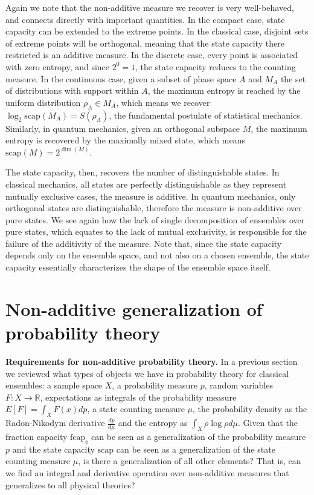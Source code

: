 \documentclass[10pt,twocolumn, nofootinbib]{revtex4-2}
\newcommand\capacity{\mathrm{scap}}
\newcommand\frcap{\mathrm{fcap}}
\newcommand{\ens}[1][e] {\mathsf{#1}} %
\begin{document}
Again we note that the non-additive measure we recover is very well-behaved, and connects directly with important quantities. In the compact case, state capacity can be extended to the extreme points. In the classical case, disjoint sets of extreme points will be orthogonal, meaning that the state capacity there restricted is an additive measure. In the discrete case, every point is associated with zero entropy, and since $2^0=1$, the state capacity reduces to the counting measure. In the continuous case, given a subset of phase space $A$ and $M_A$ the set of distributions with support within $A$, the maximum entropy is reached by the uniform distribution $\rho_A \in M_A$, which means we recover $\log_2 \capacity(M_A) = S(\rho_A)$, the fundamental postulate of statistical mechanics. Similarly, in quantum mechanics, given an orthogonal subspace $M$, the maximum entropy is recovered by the maximally mixed state, which means $\capacity(M) = 2^{\dim(M)}$.

The state capacity, then, recovers the number of distinguishable states. In classical mechanics, all states are perfectly distinguishable as they represent mutually exclusive cases, the measure is additive. In quantum mechanics, only orthogonal states are distinguishable, therefore the measure is non-additive over pure states. We see again how the lack of single decomposition of ensembles over pure states, which equates to the lack of mutual exclusivity, is responsible for the failure of the additivity of the measure. Note that, since the state capacity depends only on the ensemble space, and not also on a chosen ensemble, the state capacity essentially characterizes the shape of the ensemble space itself.

\section{Non-additive generalization of probability theory}

\textbf{Requirements for non-additive probability theory.} In a previous section we reviewed what types of objects we have in probability theory for classical ensembles: a sample space $X$, a probability measure $p$, random variables $F : X \to \mathbb{R}$, expectations as integrals of the probability measure $E[F] = \int_X F(x) dp$, a state counting measure $\mu$, the probability density as the Radon-Nikodym derivative $\frac{dp}{d\mu}$ and the entropy as $\int_X \rho \log \rho d\mu$.  Given that the fraction capacity $\frcap_{\ens}$ can be seen as a generalization of the probability measure $p$ and the state capacity $\capacity$ can be seen as a generalization of the state counting measure $\mu$, is there a generalization of all other elements? That is, can we find an integral and derivative operation over non-additive measures that generalizes to all physical theories?
\end{document}
